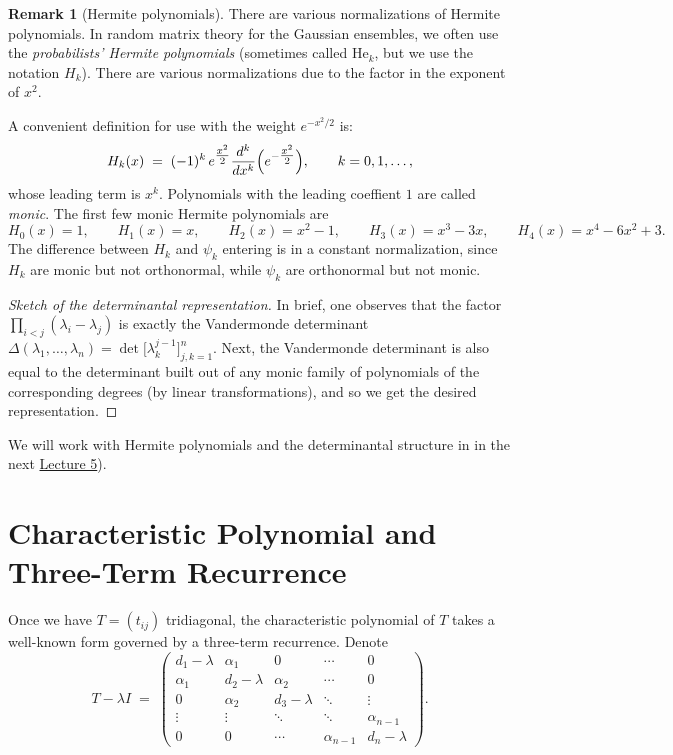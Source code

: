 \documentclass[letterpaper,11pt,oneside,reqno]{article}
\numberwithin{equation}{section}
\theoremstyle{definition}
\newtheorem{remark}[proposition]{Remark}
\begin{document}
\begin{remark}[Hermite polynomials]
  There are various normalizations of Hermite polynomials. 
  In random matrix theory for the Gaussian ensembles, 
  we often use the \emph{probabilists' Hermite polynomials} 
	(sometimes called \(\mathrm{He}_k\), but we use the notation $H_k$).
	There are various normalizations due to the factor in the exponent
	of $x^2$.

  A convenient definition for use with the weight \(e^{-x^2/2}\) is:
  \[
    H_k(x)
    \;=\;
    (-1)^k\, e^{\tfrac{x^2}{2}}
    \frac{d^k}{dx^k}
    \Bigl(e^{-\tfrac{x^2}{2}}\Bigr),
		\qquad 
		k=0,1,\ldots,
  \]
  whose leading term is \(x^k\). 
	Polynomials with the leading coeffient \(1\) are called \emph{monic}.
	The first few monic Hermite polynomials are
	\[
		H_0(x) = 1,\qquad
		H_1(x) = x,\qquad
		H_2(x) = x^2 - 1,\qquad
		H_3(x) = x^3 - 3x,\qquad 
		H_4(x) = x^4 - 6x^2 + 3.
	\]
	The difference between $H_k$ and $\psi_k$ entering 
	is in a constant normalization,
	since $H_k$ are monic but not orthonormal, 
	while $\psi_k$ are orthonormal but not monic.
\end{remark}

\begin{proof}[Sketch of the determinantal representation]
  In brief, one observes that the factor 
  \(\prod_{i<j}(\lambda_i - \lambda_j)\) 
  is exactly the Vandermonde determinant 
  \(\Delta(\lambda_1,\dots,\lambda_n) 
  = \det\bigl[\lambda_k^{j-1}\bigr]_{j,k=1}^n\).
	Next, the Vandermonde determinant is also equal to 
	the determinant built out of any monic family of polynomials of the corresponding
	degrees (by linear transformations), and so we get the desired
	representation.
\end{proof}

We will work with Hermite polynomials 
and the determinantal structure in  
in the next 
\href{https://lpetrov.cc/rmt25/rmt25-notes/rmt2025-l05.pdf}{Lecture 5}).





\section{Characteristic Polynomial and Three-Term Recurrence}
\label{sec:3term}

Once we have $T = (t_{ij})$ tridiagonal, the characteristic polynomial of $T$ takes a well-known form governed by a three-term recurrence. Denote
\[
  T - \lambda I \;=\;
  \begin{pmatrix}
    d_1 - \lambda & \alpha_1 & 0 & \cdots & 0 \\
    \alpha_1 & d_2 - \lambda & \alpha_2 & \cdots & 0 \\
    0        & \alpha_2 & d_3 - \lambda & \ddots & \vdots \\
    \vdots   & \vdots   & \ddots & \ddots & \alpha_{n-1} \\
    0        & 0        & \cdots & \alpha_{n-1} & d_n - \lambda
  \end{pmatrix}.
\]
\end{document}
